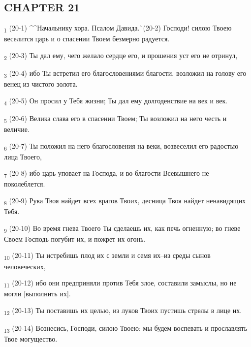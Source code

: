 \subsection{CHAPTER 21}
\begin{tcolorbox}
\textsubscript{1} (20-1) ^^Начальнику хора. Псалом Давида.^^ (20-2) Господи! силою Твоею веселится царь и о спасении Твоем безмерно радуется.
\end{tcolorbox}
\begin{tcolorbox}
\textsubscript{2} (20-3) Ты дал ему, чего желало сердце его, и прошения уст его не отринул,
\end{tcolorbox}
\begin{tcolorbox}
\textsubscript{3} (20-4) ибо Ты встретил его благословениями благости, возложил на голову его венец из чистого золота.
\end{tcolorbox}
\begin{tcolorbox}
\textsubscript{4} (20-5) Он просил у Тебя жизни; Ты дал ему долгоденствие на век и век.
\end{tcolorbox}
\begin{tcolorbox}
\textsubscript{5} (20-6) Велика слава его в спасении Твоем; Ты возложил на него честь и величие.
\end{tcolorbox}
\begin{tcolorbox}
\textsubscript{6} (20-7) Ты положил на него благословения на веки, возвеселил его радостью лица Твоего,
\end{tcolorbox}
\begin{tcolorbox}
\textsubscript{7} (20-8) ибо царь уповает на Господа, и во благости Всевышнего не поколеблется.
\end{tcolorbox}
\begin{tcolorbox}
\textsubscript{8} (20-9) Рука Твоя найдет всех врагов Твоих, десница Твоя найдет ненавидящих Тебя.
\end{tcolorbox}
\begin{tcolorbox}
\textsubscript{9} (20-10) Во время гнева Твоего Ты сделаешь их, как печь огненную; во гневе Своем Господь погубит их, и пожрет их огонь.
\end{tcolorbox}
\begin{tcolorbox}
\textsubscript{10} (20-11) Ты истребишь плод их с земли и семя их--из среды сынов человеческих,
\end{tcolorbox}
\begin{tcolorbox}
\textsubscript{11} (20-12) ибо они предприняли против Тебя злое, составили замыслы, но не могли [выполнить их].
\end{tcolorbox}
\begin{tcolorbox}
\textsubscript{12} (20-13) Ты поставишь их целью, из луков Твоих пустишь стрелы в лице их.
\end{tcolorbox}
\begin{tcolorbox}
\textsubscript{13} (20-14) Вознесись, Господи, силою Твоею: мы будем воспевать и прославлять Твое могущество.
\end{tcolorbox}
